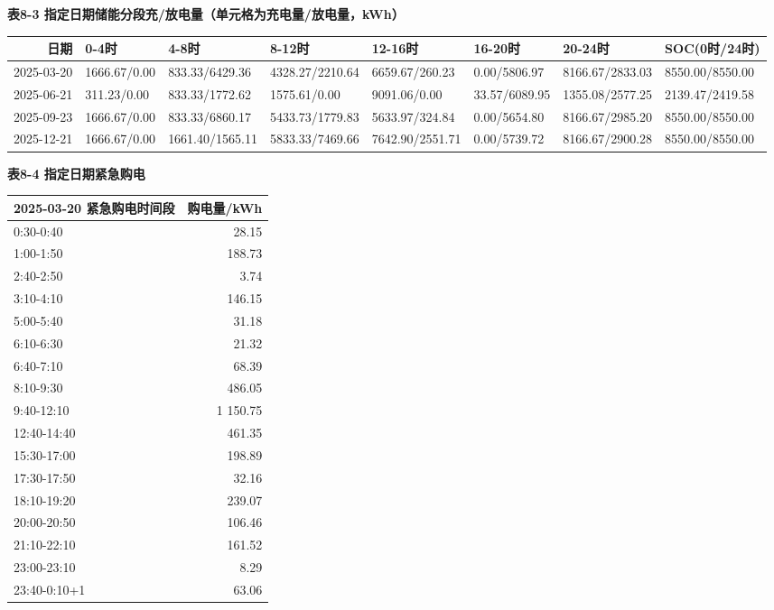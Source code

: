 \documentclass[12pt,a4paper]{ctexart}
\begin{document}
\textbf{表8-3 指定日期储能分段充/放电量（单元格为充电量/放电量，kWh）}\par
\begin{table}[htbp]
\centering
\small
\begin{tabularx}{\textwidth}{@{}r X X X X X X X@{}}
\toprule
日期 & 0-4时 & 4-8时 & 8-12时 & 12-16时 & 16-20时 & 20-24时 & SOC(0时/24时) \\
\midrule
2025-03-20 & 1666.67/0.00 & 833.33/6429.36 & 4328.27/2210.64 & 6659.67/260.23 & 0.00/5806.97 & 8166.67/2833.03 & 8550.00/8550.00 \\
2025-06-21 & 311.23/0.00 & 833.33/1772.62 & 1575.61/0.00 & 9091.06/0.00 & 33.57/6089.95 & 1355.08/2577.25 & 2139.47/2419.58 \\
2025-09-23 & 1666.67/0.00 & 833.33/6860.17 & 5433.73/1779.83 & 5633.97/324.84 & 0.00/5654.80 & 8166.67/2985.20 & 8550.00/8550.00 \\
2025-12-21 & 1666.67/0.00 & 1661.40/1565.11 & 5833.33/7469.66 & 7642.90/2551.71 & 0.00/5739.72 & 8166.67/2900.28 & 8550.00/8550.00 \\
\bottomrule
\end{tabularx}
\end{table}
\textbf{表8-4 指定日期紧急购电}\par
\begin{table}[htbp]
\centering
\small
\begin{tabularx}{\textwidth}{@{}X r@{}}
\toprule
2025-03-20 紧急购电时间段 & 购电量/kWh \\
\midrule
0:30-0:40 & 28.15 \\
1:00-1:50 & 188.73 \\
2:40-2:50 & 3.74 \\
3:10-4:10 & 146.15 \\
5:00-5:40 & 31.18 \\
6:10-6:30 & 21.32 \\
6:40-7:10 & 68.39 \\
8:10-9:30 & 486.05 \\
9:40-12:10 & 1 150.75 \\
12:40-14:40 & 461.35 \\
15:30-17:00 & 198.89 \\
17:30-17:50 & 32.16 \\
18:10-19:20 & 239.07 \\
20:00-20:50 & 106.46 \\
21:10-22:10 & 161.52 \\
23:00-23:10 & 8.29 \\
23:40-0:10+1 & 63.06 \\
\bottomrule
\end{tabularx}
\end{table}
\end{document}
